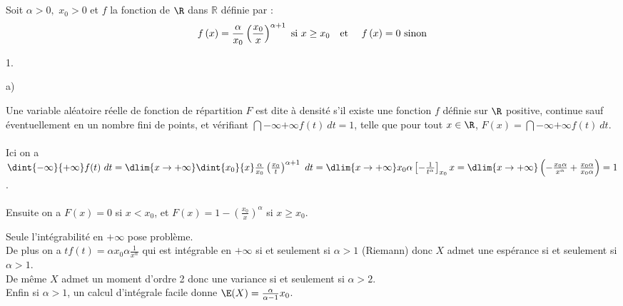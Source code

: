 \documentclass[11pt]{article}%
\begin{document}
 \newpage


\begin{exercice} \indent \\
\\
 Soit $\alpha >0,$ $x_{0}>0$ et $f$ la fonction de $\R$ dans $\mathbb{
R}$ définie par : 
\[
 f\left( x\right) = \frac{\alpha }{x_{0}}\left( \frac{x_{0}}{x}\right)
 ^{\alpha + 1}\text{ si }x\geq x_{0}\text{\quad et\quad \ }f\left(
x\right) = 0 \text{ sinon}
\]
 \begin{noliste}{1.}
 \setlength{\itemsep}{4mm}
 \item 
 \begin{noliste}{a)}
 \setlength{\itemsep}{2mm}
 \item Une variable aléatoire réelle de fonction de répartition $F$ est
dite à densité s'il existe une fonction $f$ définie sur $\R$ positive,
continue sauf éventuellement en un nombre fini de points, et vérifiant
$\dint{-\infty}{+ \infty} f(t)\ dt = 1$, telle que pour tout $x \in
\R$, $F(x) = \dint{-\infty}{+ \infty} f(t)\ dt$. \\
\\
 Ici on a $\dint{-\infty}{+ \infty} f(t)\ dt = \dlim{x \rightarrow +
\infty} \dint{x_{0}}{x} \frac{\alpha}{x_{0}} \left( \frac{x_{0}}{t}
\right)^{\alpha + 1}\ dt = \dlim{x \rightarrow + \infty} x_{0}{\alpha}
\left[ - \frac{1}{t^{\alpha}} \right]_{x_{0}}{x} = \dlim{x \rightarrow
+ \infty} \left( - \frac{x_{0}{\alpha} }{x^{\alpha} } +
\frac{x_{0}{\alpha}}{x_{0}{\alpha}} \right) = 1$. \\
\\
 Ensuite on a $F(x) = 0$ si $x < x_{0}$, et $F(x) = 1 - \left(
\frac{x_{0}}{x} \right)^{\alpha}$ si $x \geq x_{0}$. \\


 \item Seule l'intégrabilité en $ + \infty$ pose problème. \\
 De plus on a $t f(t) = \alpha x_{0}{\alpha} \frac{1}{x^{\alpha}}$ qui
est intégrable en $ + \infty$ si et seulement si $\alpha > 1$ (Riemann)
donc $X$ admet une espérance si et seulement si $\alpha > 1$. \\
 De même $X$ admet un moment d'ordre 2 donc une variance si et
seulement si $\alpha > 2$. \\
 Enfin si $\alpha > 1$, un calcul d'intégrale facile donne $\E(X) =
\frac{\alpha}{\alpha - 1} x_{0}$. \\


\end{noliste}
\end{noliste}
\end{exercice}
\end{document}
